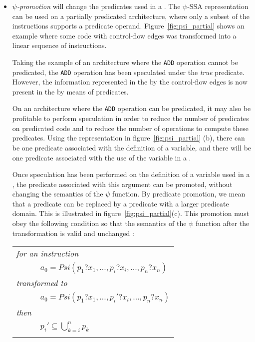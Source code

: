 \begin{itemize}

\item{\emph{$\psi$-promotion}} will change the predicates used in a
  \psifun. The $\psi$-SSA representation can be used on a
  partially predicated architecture, where only a subset of the
  instructions supports a predicate operand.
  Figure~\ref{fig:psi_partial} shows an example where some code with
  control-flow edges was transformed into a linear sequence of
  instructions.

Taking the example of an architecture where the \texttt{ADD} operation
cannot be predicated, the \texttt{ADD} operation has been speculated
under the \textit{true} predicate. However, the information represented
in the \phifun by the control-flow edges is now present in the
\psifun by means of predicates.

On an architecture where the \texttt{ADD} operation can be predicated, it
may also be profitable to perform speculation in order to reduce the
number of predicates on predicated code and to reduce the number of
operations to compute these predicates. Using the representation in
figure~\ref{fig:psi_partial} (b), there can be one predicate associated
with the definition of a variable, and there will be one predicate
associated with the use of the variable in a \psifun.

Once speculation has been performed on the definition of a variable
used in a \psifun, the predicate associated with this argument
can be promoted, without changing the semantics of the $\psi$
function. By predicate promotion, we mean that a predicate can be
replaced by a predicate with a larger predicate domain. This is
illustrated in figure~\ref{fig:psi_partial}(c). This promotion must
obey the following condition so that the semantics of the $\psi$
function after the transformation is valid and unchanged :

\begin{tabular}{ll}
\multicolumn{2}{l}{\it for an instruction} \\
\ \ \ \ & {$ {a_0 = Psi(p_1?x_1, ..., p_i?x_i, ..., p_n?x_n)}$} \\
\multicolumn{2}{l}{\it transformed to} \\
\ \ \ \ & {$ {a_0 = Psi(p_1?x_1, ..., p_i'?x_i, ..., p_n?x_n)}$} \\
\multicolumn{2}{l}{\it then} \\
\ \ \ \ & {${p_i' \subseteq \bigcup_{k=i}^n p_k}$} \\
\\
\end{tabular}


\end{itemize}
